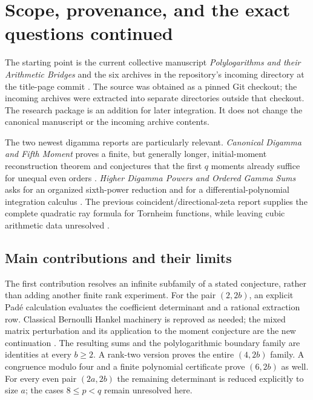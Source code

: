 \section{Scope, provenance, and the exact questions continued}
\label{sec:scope}

The starting point is the current collective manuscript
\emph{Polylogarithms and their Arithmetic Bridges} and the six
archives in the repository's incoming directory at the title-page
commit \cite{Repo}. The source was obtained as a pinned Git checkout;
the incoming archives were extracted into separate directories outside
that checkout. The research package is an addition for later
integration. It does not change the canonical manuscript or the
incoming archive contents.

The two newest digamma reports are particularly relevant.
\emph{Canonical Digamma and Fifth Moment} proves a finite, but
generally longer, initial-moment reconstruction theorem and conjectures
that the first $q$ moments already suffice for unequal even orders
\cite[Sections 7 and 9, \texttt{conj:firstq}]{CanonicalFifth}.
\emph{Higher Digamma Powers and Ordered Gamma Sums} asks for an
organized sixth-power reduction and for a differential-polynomial
integration calculus \cite[Further exact research questions]{HigherPowers}.
The previous coincident/directional-zeta report supplies the complete
quadratic ray formula for Tornheim functions, while leaving cubic
arithmetic data unresolved \cite[Section 6]{DirectionalPrior}.

\subsection{Main contributions and their limits}

The first contribution resolves an infinite subfamily of a stated
conjecture, rather than adding another finite rank experiment.
For the pair $(2,2b)$, an explicit Pad\'e calculation evaluates the
coefficient determinant and a rational extraction row. Classical
Bernoulli Hankel machinery is reproved as needed; the mixed matrix
perturbation and its application to the moment conjecture are the
new continuation \cite{DilcherJiu2020}. The resulting sums and the
polylogarithmic boundary family are identities at every $b\ge2$.
A rank-two version proves the entire $(4,2b)$ family. A congruence
modulo four and a finite polynomial certificate prove $(6,2b)$ as well. For every
even pair $(2a,2b)$ the remaining determinant is reduced explicitly to
size $a$; the cases $8\le p<q$ remain unresolved here.

